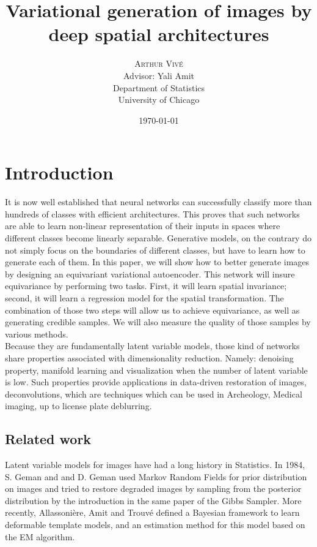 \documentclass[letterpaper, twoside]{article}
\title{Variational generation of images by deep spatial architectures} %
\author{%
\textsc{Arthur Viv\'e} \\%
Advisor: Yali Amit \\
Department of Statistics\\
University of Chicago \\ %
}
\date{\today} %
\begin{document}
\maketitle

\section*{Introduction}
    
  It is now well established that neural networks can successfully classify more than hundreds of classes with efficient architectures. This proves that such networks are able to learn non-linear representation of their inputs in spaces where different classes become linearly separable. Generative models, on the contrary do not simply focus on the boundaries of different classes, but have to learn how to generate each of them. In this paper, we will show how to better generate images by designing an equivariant variational autoencoder. This network will insure equivariance by performing two tasks. First, it will learn spatial invariance; second, it will learn a regression model for the spatial transformation. The combination of those two steps will allow us to achieve equivariance, as well as generating credible samples. We will also measure the quality of those samples by various methods.\\

  Because they are fundamentally latent variable models, those kind of networks share properties associated with dimensionality reduction. Namely: denoising property, manifold learning and visualization when the number of latent variable is low. Such properties provide applications in data-driven restoration of images, deconvolutions, which are techniques which can be used in Archeology, Medical imaging, up to license plate deblurring.

  \subsection*{Related work}
    Latent variable models for images have had a long history in Statistics. In 1984, S. Geman and and D. Geman \cite{Geman:1984:SRG:2286442.2286617} used Markov Random Fields for prior distribution on images and tried to restore degraded images by sampling from the posterior distribution by the introduction in the same paper of the Gibbs Sampler. More recently, Allassonière, Amit and Trouvé \cite{Allasson.statfram} defined a Bayesian framework to learn deformable template models, and an estimation method for this model based on the EM algorithm.\\
\end{document}

